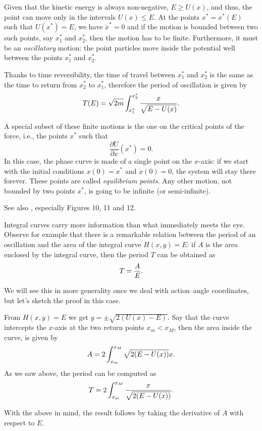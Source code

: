\documentclass[english,fontsize=11pt,paper=a5,oneside]{scrbook}
\let\d\relax
\newcommand{\d}{\mathrm{d}}
\theoremstyle{definition}
\newenvironment{remark}
  {\pushQED{\qed}\renewcommand{\qedsymbol}{$\lozenge$}\remarkx}
  {\popQED\endremarkx}
\begin{document}
Given that the kinetic energy is always non-negative, $E \geq U(x)$, and thus, the point can move only in the intervals $U(x) \leq E$.
At the points $x^* = x^*(E)$ such that $U(x^*) = E$, we have $\dot x^* = 0$ and if the motion is bounded between two such points, say $x_1^*$ and $x_2^*$, then the motion has to be finite.
Furthermore, it must be an \emph{oscillatory} motion: the point particles move inside the potential well between the points $x_1^*$ and $x_2^*$.

Thanks to time reversibility, the time of travel between $x_1^*$ and $x_2^*$ is the same as the time to return from $x_2^*$ to $x_1^*$, therefore the period of oscillation is given by
\begin{equation}\label{eq:osc}
  T(E) = \sqrt{2m} \int_{x^*_1}^{x^*_2} \frac{\d x}{\sqrt{E-U(x)}}.
\end{equation}

A special subset of these finite motions is the one on the critical points of the force, i.e., the points $x^*$ such that
\begin{equation}
  \frac{\partial U}{\partial x}(x^*) = 0.
\end{equation}
In this case, the phase curve is made of a single point on the $x$-axis: if we start with the initial conditions $x(0) = x^*$ and $\dot x(0) = 0$, the system will stay there forever. These points are called \emph{equilibrium points}.
%
Any other motion, not bounded by two points $x^*$, is going to be infinite (or semi-infinite).

See also \cite[Chapter 2.4]{book:arnold}, especially Figures 10, 11 and 12.

\begin{remark}
  Integral curves carry more information than what immediately meets the eye.
  Observe for example that there is a remarkable relation between the period of an oscillation and the area of the integral curve $H(x,y) = E$:
  if $A$ is the area enclosed by the integral curve, then the period $T$ can be obtained as
  \begin{equation}
    T = \frac{\d A}{\d E}.
  \end{equation}

  We will see this in more generality once we deal with action--angle coordinates, but let's sketch the proof in this case.

  From $H(x,y) = E$ we get $y = \pm \sqrt{2(U(x) - E)}$. Say that the curve intercepts the $x$-axis at the two return points $x_m < x_M$, then the area inside the curve, is given by
  \begin{equation}
    A = 2\int_{x_m}^{x_M}\sqrt{2(E - U(x))} \d x.
  \end{equation}
  As we saw above, the period can be computed as
  \begin{equation}
    T = 2\int_{x_m}^{x_M} \frac{\d x}{\sqrt{2(E - U(x))}}.
  \end{equation}

  With the above in mind, the result follows by taking the derivative of $A$ with respect to $E$.
\end{remark}
\end{document}
